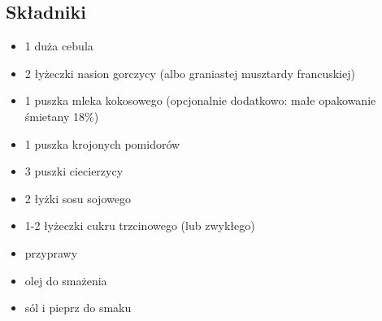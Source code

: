 \documentclass[a4paper,10pt]{book}
\begin{document}
\begin{multicols}{2}

\subsection*{Składniki} 
\begin{itemize} 
    \item 1 duża cebula 
    \item 2 łyżeczki nasion gorczycy (albo graniastej musztardy francuskiej) 
    \item 1 puszka mleka kokosowego (opcjonalnie dodatkowo: małe opakowanie śmietany 18\%) 
    \item 1 puszka krojonych pomidorów 
    \item 3 puszki ciecierzycy 
    \item 2 łyżki sosu sojowego 
    \item 1-2 łyżeczki cukru trzcinowego (lub zwykłego) 
    \item przyprawy 
    \item olej do smażenia 
    \item sól i pieprz do smaku
\end{itemize}

\columnbreak

\begin{figure}[H] \centering {} \end{figure}

\end{multicols}

\vspace{0.5cm}
\end{document}
